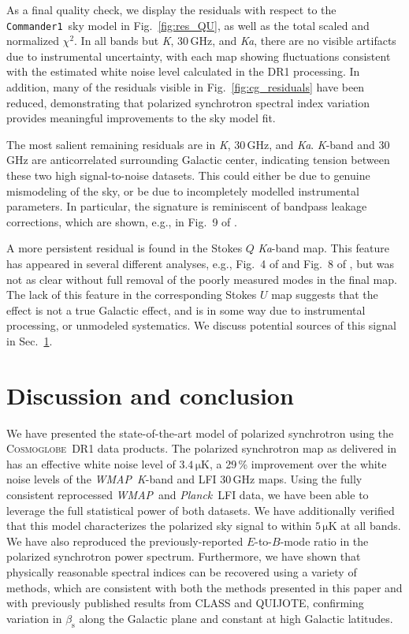 \documentclass[twocolumn]{../../common/aa}
\def\WMAP{\emph{WMAP}}
\def\Planck{\emph{Planck}}
\def\commanderone{\texttt{Commander1}}
\newcommand{\cosmoglobe}{\textsc{Cosmoglobe}}
\newcommand{\K}[0]{\textit K}
\newcommand{\Ka}[0]{\textit{Ka}}
\begin{document}


As a final quality check, we display the residuals with respect to the \commanderone\ sky model in Fig.~\ref{fig:res_QU}, as well as the total scaled and normalized $\chi^2$. In all bands but \K, 30\,GHz, and \Ka, there are no visible artifacts due to instrumental uncertainty, with each map showing fluctuations consistent with the estimated white noise level calculated in the DR1 processing.  In addition, many of the residuals visible in Fig.~\ref{fig:cg_residuals} have been reduced, demonstrating that polarized synchrotron spectral index variation provides meaningful improvements to the sky model fit.

The most salient remaining residuals are in \K, 30\,GHz, and \Ka. \K-band and 30\,GHz are anticorrelated surrounding Galactic center, indicating  tension between these two high signal-to-noise datasets. This could either be due to genuine mismodeling of the sky, or be due to incompletely modelled instrumental parameters. In particular, the signature is reminiscent of bandpass leakage corrections, which are shown, e.g., in Fig.~9 of \citet{bp09}.

A more persistent residual is found in the Stokes $Q$ \Ka-band map. This feature has appeared in several different analyses, e.g., Fig.~4 of \citet{bp14} and Fig.~8 of \citet{weiland:2022}, but was not as clear without full removal of the poorly measured modes in the final map. The lack of this feature in the corresponding Stokes $U$ map suggests that the effect is not a true Galactic effect, and is in some way due to instrumental processing, or unmodeled systematics. We discuss potential sources of this signal in Sec.~\ref{sec:conclusion}.






\section{Discussion and conclusion}
\label{sec:conclusion}

We have presented the state-of-the-art model of polarized synchrotron using the \cosmoglobe\ DR1 data products. The polarized synchrotron map as delivered in \citet{watts2023_dr1} has an effective white noise level of $3.4\,\mathrm{\mu K}$, a 29\,\% improvement over the white noise levels of the \WMAP\ \K-band and LFI 30\,GHz maps. Using the fully consistent reprocessed \WMAP\ and \Planck\ LFI data, we have been able to leverage the full statistical power of both datasets. We have additionally verified that this model characterizes the polarized sky signal to within $5\,\mathrm{\mu K}$ at all bands. We have also reproduced the previously-reported $E$-to-$B$-mode ratio in the polarized synchrotron power spectrum. Furthermore, we have shown that physically reasonable spectral indices can be recovered using a variety of methods, which are consistent with both the methods presented in this paper and with previously published results from CLASS and QUIJOTE, confirming variation in $\beta_\mathrm s$ along the Galactic plane and constant at high Galactic latitudes.
\end{document}

